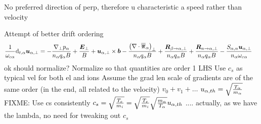 No preferred direction of perp, therefore u characteristic a speed rather than velocity

Attempt of better drift ordering
%
\begin{align*}
 \frac{1}{\omega_{c\alpha}}\text{d}_{t,\alpha} \boldsymbol{u}_{\alpha,\perp}
 &=
 -
 \frac{
   \nabla_\perp p_\alpha
 }{n_\alpha  q_\alpha B}
 +
 \frac{\boldsymbol{E}_\perp}{B}
 +
 \boldsymbol{u}_{\alpha,\perp}\times\boldsymbol{b}
 -
  \frac{
   \left(\nabla\cdot\boldsymbol{\overline{\overline{\pi}}}_\alpha\right)_\perp
 }{n_\alpha  q_\alpha B}
 +
 \frac{
   \boldsymbol{R}_{\beta \to \alpha,\perp}
 }{n_\alpha q_\alpha B}
 +
 \frac{
   \boldsymbol{R}_{n \to \alpha,\perp}
 }{n_\alpha q_\alpha B}
 -
 \frac{
     S_{\alpha,n}\boldsymbol{u}_{\alpha,\perp}
 }{n_\alpha \omega_{c\alpha}}
\end{align*}
%
ok
should normalize?
Normalize so that quantities are order 1
LHS
Use $c_s$ as typical vel for both el and ions
Assume the grad len scale of gradients are of the same order (in the end, all related to the velocity)
$v_0+v_1+\ldots$
$u_{\alpha,th}=\sqrt{\frac{T_\alpha}{m_\alpha}}$
FIXME: Use cs consistently
$c_s = \sqrt{\frac{T_e}{m_i}}=\sqrt{\frac{T_e}{m_i}}\sqrt{\frac{m_\alpha}{T_\alpha}}u_{\alpha,th}$
....
actually, as we have the lambda, no need for tweaking out $c_s$

